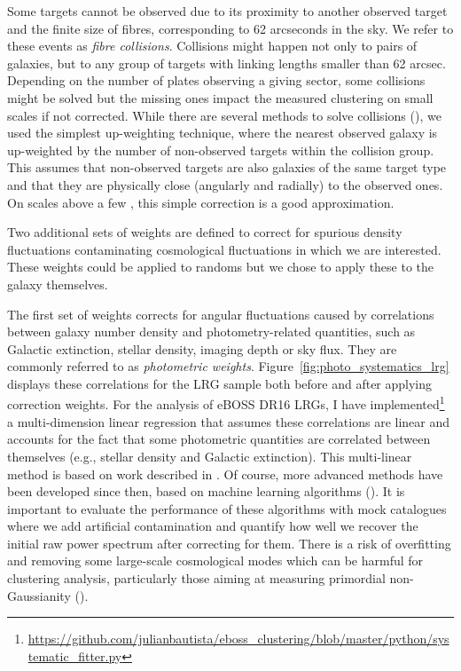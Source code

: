 Some targets cannot be observed due to 
its proximity to another observed target and the finite size of fibres, corresponding 
to 62 arcseconds in the sky. We refer to these events as \emph{fibre collisions}. 
Collisions might happen not only to pairs of galaxies, but to any group of targets with 
linking lengths smaller than 62 arcsec. Depending on the number of plates observing 
a giving sector, some collisions might be solved but the missing ones  
impact the measured clustering on small scales if not corrected. 
While there are several methods to solve collisions 
(\cite{guoNewMethodCorrect2012, bianchiUnbiasedClusteringEstimation2017}),
we used the simplest up-weighting technique, where the nearest observed galaxy 
is up-weighted by the number of non-observed targets within the collision group. 
This assumes that non-observed targets are also galaxies of the same target type and 
that they are physically close (angularly and radially) to the observed ones.
On scales above a few \hmpc, this simple correction is a good approximation. 

Two additional sets of weights are defined to correct for spurious density 
fluctuations contaminating cosmological fluctuations in which we are interested. 
These weights could be applied to randoms but we chose to apply these to the 
galaxy themselves. 

The first set of weights corrects for angular fluctuations caused 
by correlations between galaxy number density and photometry-related quantities,
such as Galactic extinction, stellar density, imaging depth or sky flux.
They are commonly referred to as \emph{photometric weights}. 
Figure~\ref{fig:photo_systematics_lrg} displays these correlations 
for the LRG sample both before and after applying correction weights. 
For the analysis of eBOSS DR16 LRGs, I have 
implemented\footnote{\url{https://github.com/julianbautista/eboss_clustering/blob/master/python/systematic_fitter.py}} 
a multi-dimension 
linear regression that assumes these correlations are linear and 
accounts for the fact that some photometric quantities are correlated between themselves 
(e.g., stellar density and Galactic extinction).
This multi-linear method is based on work described in \cite{prakashSDSSIVExtendedBaryon2016}.
Of course, more advanced methods have been developed since then, based on 
machine learning algorithms 
(\cite{rezaieImprovingGalaxyClustering2020, chaussidonAngularClusteringProperties2021}).
It is important to evaluate the performance of these algorithms with mock catalogues
where we add artificial contamination 
and quantify how well we recover the initial raw power spectrum after correcting for them. 
There is a risk of overfitting and removing some large-scale cosmological modes which 
can be harmful for clustering analysis, particularly those aiming at measuring 
primordial non-Gaussianity 
(\cite{rezaiePrimordialNonGaussianityCompleted2021, muellerClusteringGalaxiesCompleted2021}).

